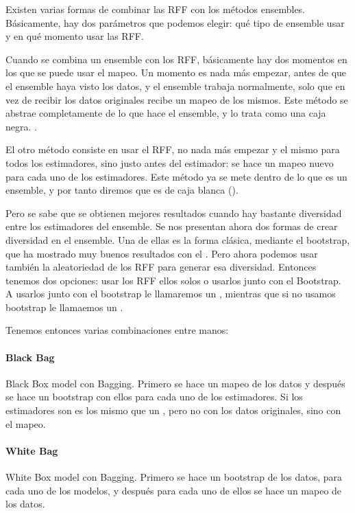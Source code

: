   Existen varias formas de combinar las RFF con los métodos ensembles. Básicamente,
  hay dos parámetros que podemos elegir: qué tipo de ensemble usar y en qué
  momento usar las RFF.

  Cuando se combina un ensemble con los RFF, básicamente hay dos momentos en
  los que se puede usar el mapeo. Un momento es nada más empezar, antes de
  que el ensemble haya visto los datos, y el ensemble trabaja normalmente, solo
  que en vez de recibir los datos originales recibe un mapeo de los mismos.
  Este método se abstrae completamente de lo que hace el ensemble, y lo trata
  como una caja negra. .

  El otro método consiste en usar el RFF, no nada más empezar y el mismo para
  todos los estimadores, sino justo antes del estimador: se hace un mapeo nuevo
  para cada uno de los estimadores. Este método ya se mete dentro de lo que es
  un ensemble, y por tanto diremos que es de caja blanca ().

  Pero se sabe que se obtienen mejores resultados cuando hay bastante diversidad
  entre los estimadores del ensemble. Se nos presentan ahora dos formas de crear
  diversidad en el ensemble. Una de ellas es la forma clásica, mediante el
  bootstrap, que ha mostrado muy buenos resultados con el .
  Pero ahora podemos usar también la aleatoriedad de los RFF para generar
  esa diversidad. Entonces tenemos dos opciones: usar los RFF ellos solos o usarlos
  junto con el Bootstrap. A usarlos junto con el bootstrap le llamaremos un
  , mientras que si no usamos bootstrap le llamaemos un .

  Tenemos entonces varias combinaciones entre manos:

  \paragraph{Black Bag}
  Black Box model con Bagging. Primero se hace un mapeo de los datos y después se
  hace un bootstrap con ellos para cada uno de los estimadores. Si los estimadores
  son  es los mismo que un , pero no con los
  datos originales, sino con el mapeo.

  \paragraph{White Bag}
  White Box model con Bagging. Primero se hace un bootstrap de los datos, para
  cada uno de los modelos, y después para cada uno de ellos se hace un mapeo de
  los datos.

